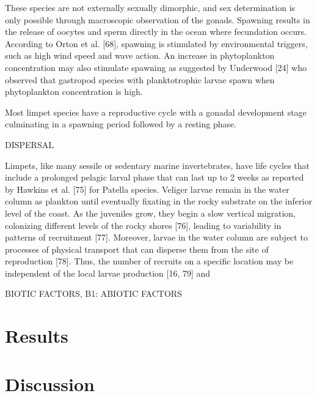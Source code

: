\documentclass[12pt]{article}
\begin{document}
\begin{flushleft}
These species are not externally sexually dimorphic, and sex determination is only possible through macroscopic observation of the gonads. Spawning results in the release of oocytes and sperm directly in the ocean where fecundation occurs. According to Orton et al. [68], spawning is stimulated by environmental triggers, such as high wind speed and wave action. An increase in phytoplankton concentration may also stimulate spawning as suggested by Underwood [24] who observed that gastropod species with planktotrophic larvae spawn when phytoplankton concentration is high.

Most limpet species have a reproductive cycle with a gonadal development stage culminating in a spawning period followed by a resting phase. 



DISPERSAL

Limpets, like many sessile or sedentary marine invertebrates, have life cycles that include a prolonged pelagic larval phase that can last up to 2 weeks as reported by Hawkins et al. [75] for Patella species. Veliger larvae remain in the water column as plankton until eventually fixating in the rocky substrate on the inferior level of the coast. As the juveniles grow, they begin a slow vertical migration, colonizing different levels of the rocky shores [76], leading to variability in patterns of recruitment [77]. Moreover, larvae in the water column are subject to processes of physical transport that can disperse them from the site of reproduction [78]. Thus, the number of recruits on a specific location may be independent of the local larvae production [16, 79] and 


BIOTIC FACTORS, B1: 
ABIOTIC FACTORS




\section{Results}



\section{Discussion}


\end{flushleft}
\end{document}
